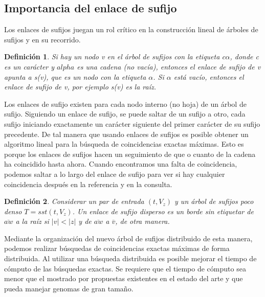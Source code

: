 \documentclass[12pt,a4paper]{article}
\newtheorem{mydef}{Definición}
\begin{document}
\subsection{Importancia del enlace de sufijo}
Los enlaces de sufijos juegan un rol crítico en la construcción lineal de árboles de sufijos y en su
recorrido.
\begin{mydef}
  Si hay un nodo v en el árbol de sufijos con la etiqueta $c\alpha$, donde c es un carácter y $alpha$
  es una cadena (no vacía), entonces el enlace de sufijo de v apunta a s(v), que es un nodo con la
  etiqueta $\alpha$. Si $\alpha$ está vacío, entonces el enlace de sufijo de v, por ejemplo s(v) es la
  raíz. 
\end{mydef}
Los enlaces de sufijo existen para cada nodo interno (no hoja) de un árbol de sufijo. Siguiendo un 
enlace de sufijo, se puede saltar de un sufijo a otro, cada sufijo iniciando exactamente un carácter
siguiente del primer carácter de su sufijo precedente. De tal manera que usando enlaces de sufijos es
posible obtener un algoritmo lineal para la búsqueda de coincidencias exactas máximas. Esto es porque
los enlaces de sufijos hacen un seguimiento de que o cuanto de la cadena ha coincidido hasta ahora.
Cuando encontramos una falta de coincidencia, podemos saltar a lo largo del enlace de sufijo para 
ver si hay cualquier coincidencia despu\'es en la referencia y en la consulta.
\begin{mydef}
  Considerar un par de entrada $(t,V_{z})$ y un árbol de sufijos poco denso $T=sst(t,V_{z})$. Un enlace
  de sufijo disperso es un borde sin etiquetar de $\overline{aw}$ a la raíz si $|v|<|z|$ y de $\overline{aw}$
  a $\overline{v}$, de otra manera.
\end{mydef}
Mediante la organización del nuevo árbol de sufijos distribuido de esta manera, 
podemos realizar búsquedas de coincidencias exactas máximas de forma distribuida. Al
utilizar una búsqueda distribuida es posible mejorar el tiempo de cómputo de 
las búsquedas exactas. Se requiere que el tiempo de cómputo sea menor que el 
mostrado por propuestas existentes en el estado del arte y que pueda manejar
genomas de gran tamaño.\\
\end{document}
